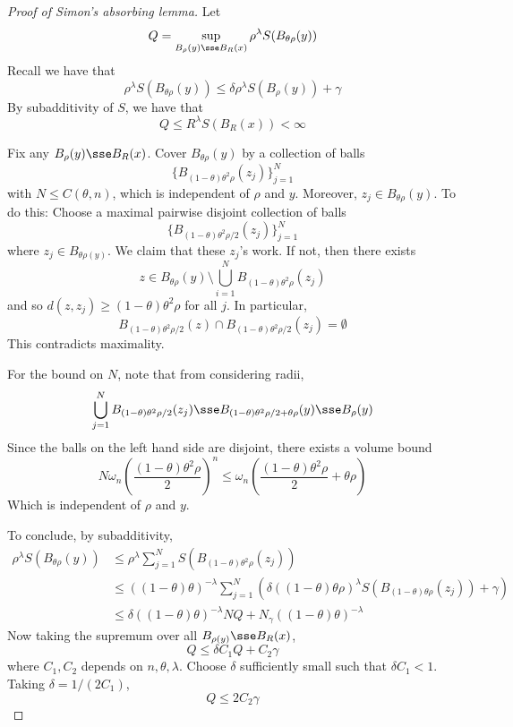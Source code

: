 \documentclass{article}
\begin{document}
\begin{proof}
    [Proof of Simon's absorbing lemma]

    Let
    \[Q = \sup_{B_\rho(y) \sse B_R(x)}\rho^\lambda S(B_{\theta\rho}(y))\]
    Recall we have that
    \[\rho^\lambda S(B_{\theta\rho}(y)) \le \delta\rho^\lambda S(B_\rho(y)) + \gamma\]
    By subadditivity of \(S\), we have that
    \[Q \le R^\lambda S(B_R(x)) < \infty\]

    Fix any \(B_\rho(y) \sse B_R(x)\). Cover \(B_{\theta\rho}(y)\) by a collection of balls
    \[\{B_{(1-\theta)\theta^2\rho}(z_j)\}_{j=1}^N\]
    with \(N \le C(\theta, n)\), which is independent of \(\rho\) and \(y\). Moreover, \(z_j \in B_{\theta\rho}(y)\). To do this: Choose a maximal pairwise disjoint collection of balls
    \[\{B_{(1-\theta)\theta^2\rho/2}(z_j)\}_{j=1}^N\]
    where \(z_j \in B_{\theta\rho(y)}\). We claim that these \(z_j\)'s work. If not, then there exists
    \[z \in B_{\theta\rho}(y) \setminus \bigcup_{i=1}^N B_{(1 - \theta)\theta^2\rho}(z_j)\]
    and so \(d(z, z_j) \ge (1 - \theta)\theta^2\rho\) for all \(j\). In particular,
    \[B_{(1-\theta)\theta^2\rho/2}(z) \cap B_{(1-\theta)\theta^2\rho/2}(z_j) = \emptyset\]
    This contradicts maximality.

    For the bound on \(N\), note that from considering radii,
    \[\bigcup_{j=1}^N B_{(1-\theta)\theta^2\rho/2}(z_j) \sse B_{(1-\theta)\theta^2\rho/2 + \theta\rho}(y) \sse B_\rho(y)\]
    Since the balls on the left hand side are disjoint, there exists a volume bound
    \[N \omega_n\left(\frac{(1 - \theta)\theta^2\rho}{2}\right)^n \le \omega_n\left(\frac{(1 - \theta)\theta^2\rho}{2} + \theta\rho\right)\]
    Which is independent of \(\rho\) and \(y\).

    To conclude, by subadditivity,
    \begin{align*}
        \rho^\lambda S(B_{\theta\rho}(y)) &\le \rho^\lambda \sum_{j=1}^N S(B_{(1 - \theta)\theta^2\rho}(z_j)) \\
        &\le \left((1 - \theta)\theta\right)^{-\lambda}\sum_{j=1}^N\left(\delta\left((1 - \theta)\theta\rho\right)^\lambda S(B_{(1 - \theta)\theta \rho}(z_j)) + \gamma\right) \\
        &\le \delta((1 - \theta)\theta)^{-\lambda}NQ + N_\gamma((1 - \theta)\theta)^{-\lambda}
    \end{align*}
    Now taking the supremum over all \(B_{\rho(y)} \sse B_R(x)\),
    \[Q \le \delta C_1 Q + C_2 \gamma\]
    where \(C_1, C_2\) depends on \(n, \theta, \lambda\). Choose \(\delta\) sufficiently small such that \(\delta C_1 < 1\). Taking \(\delta = 1/(2C_1)\),
    \[Q \le 2C_2\gamma\]
\end{proof}
\end{document}
